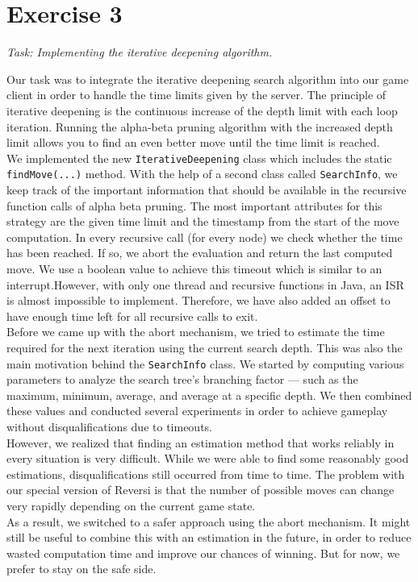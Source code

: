 \section*{Exercise 3}

\textit{Task: Implementing the iterative deepening algorithm.}

\noindent Our task was to integrate the iterative deepening search algorithm into our game client in order to handle the time limits given by the server. The principle of iterative deepening is the continuous increase of the depth limit with each loop iteration. Running the alpha-beta pruning algorithm with the increased depth limit allows you to find an even better move until the time limit is reached.\\
We implemented the new \texttt{IterativeDeepening} class which includes the static \texttt{findMove(...)} method. With the help of a second class called \texttt{SearchInfo}, we keep track of the important information that should be available in the recursive function calls of alpha beta pruning. The most important attributes for this strategy are the given time limit and the timestamp from the start of the move computation. In every recursive call (for every node) we check whether the time has been reached. If so, we abort the evaluation and return the last computed move. We use a boolean value to achieve this timeout which is similar to an interrupt.However, with only one thread and recursive functions in Java, an ISR is almost impossible to implement. Therefore, we have also added an offset to have enough time left for all recursive calls to exit.\\
Before we came up with the abort mechanism, we tried to estimate the time required for the next iteration using the current search depth. This was also the main motivation behind the \texttt{SearchInfo} class. We started by computing various parameters to analyze the search tree's branching factor — such as the maximum, minimum, average, and average at a specific depth. We then combined these values and conducted several experiments in order to achieve gameplay without disqualifications due to timeouts.\\
However, we realized that finding an estimation method that works reliably in every situation is very difficult. While we were able to find some reasonably good estimations, disqualifications still occurred from time to time. The problem with our special version of Reversi is that the number of possible moves can change very rapidly depending on the current game state.\\
As a result, we switched to a safer approach using the abort mechanism. It might still be useful to combine this with an estimation in the future, in order to reduce wasted computation time and improve our chances of winning. But for now, we prefer to stay on the safe side.